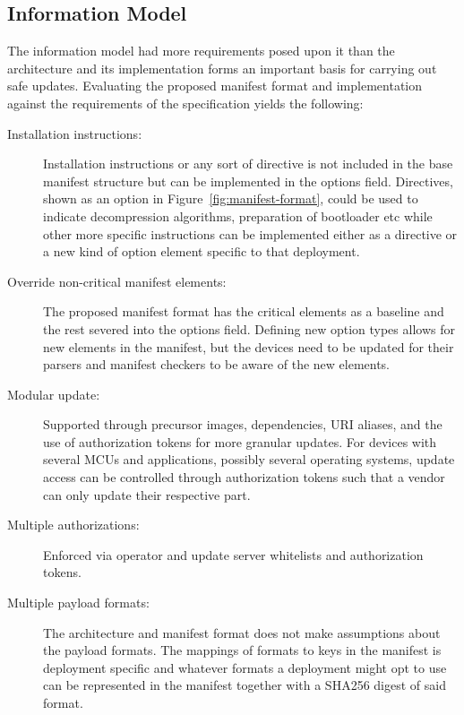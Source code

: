 \documentclass[0-thesis.tex]{subfiles}
\begin{document}
\subsection{Information Model}
\label{ssec:information-evaluation}
The information model had more requirements posed upon it than the architecture and its
implementation forms an important basis for carrying out safe updates. Evaluating the
proposed manifest format and implementation against the requirements of the specification
yields the following:

\begin{description}
    \item[Installation instructions:]
        Installation instructions or any sort of directive is not included in the base
        manifest structure but can be implemented in the options field. Directives, shown
        as an option in Figure~\ref{fig:manifest-format}, could be used to indicate
        decompression algorithms, preparation of bootloader etc while other more specific
        instructions can be implemented either as a directive or a new kind of option
        element specific to that deployment.

    \item[Override non-critical manifest elements:]
        The proposed manifest format has the critical elements as a baseline and the rest
        severed into the options field. Defining new option types allows for new
        elements in the manifest, but the devices need to be updated for their parsers and
        manifest checkers to be aware of the new elements.

    \item[Modular update:]
        Supported through precursor images, dependencies, URI aliases, and the use of
        authorization tokens for more granular updates. For devices with several MCUs and
        applications, possibly several operating systems, update access can be controlled
        through authorization tokens such that a vendor can only update their respective
        part.

    \item[Multiple authorizations:]
        Enforced via operator and update server whitelists and authorization tokens.

    \item[Multiple payload formats:]
        The architecture and manifest format does not make assumptions about the payload
        formats. The mappings of formats to keys in the manifest is deployment
        specific and whatever formats a deployment might opt to use can be represented in
        the manifest together with a SHA256 digest of said format.


\end{description}
\end{document}
